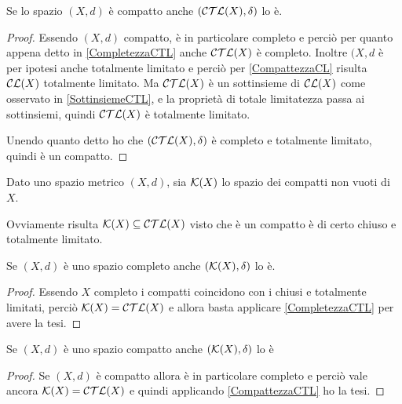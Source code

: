 \begin{corollary}\label{CompattezzaCTL}
	Se lo spazio $(X,d)$ è compatto anche $(\mathcal{CTL}(X),\delta)$ lo è.
\end{corollary}
\begin{proof}
	Essendo $(X,d)$ compatto, è in particolare completo e perciò per quanto appena detto in \cref{CompletezzaCTL} anche $\mathcal{CTL}(X)$ è completo. Inoltre $(X,d$ è per ipotesi anche totalmente limitato e perciò per \cref{CompattezzaCL} risulta $\mathcal{CL}(X)$ totalmente limitato. Ma $\mathcal{CTL}(X)$ è un sottinsieme di $\mathcal{CL}(X)$ come osservato in \cref{SottinsiemeCTL}, e la proprietà di totale limitatezza passa ai sottinsiemi, quindi $\mathcal{CTL}(X)$ è totalmente limitato.
	
	Unendo quanto detto ho che $(\mathcal{CTL}(X),\delta)$ è completo e totalmente limitato, quindi è un compatto.
\end{proof}

\begin{definition}
	Dato uno spazio metrico $(X,d)$, sia $\mathcal{K}(X)$ lo spazio dei compatti non vuoti di $X$.
\end{definition}
\begin{remark}
	Ovviamente risulta $\mathcal{K}(X)\subseteq \mathcal{CTL}(X)$ visto che è un compatto è di certo chiuso e totalmente limitato.
\end{remark}

\begin{corollary}
	Se $(X,d)$ è uno spazio completo anche $(\mathcal{K}(X),\delta)$ lo è.
\end{corollary}
\begin{proof}
	Essendo $X$ completo i compatti coincidono con i chiusi e totalmente limitati, perciò $\mathcal{K}(X)=\mathcal{CTL}(X)$ e allora basta applicare \cref{CompletezzaCTL} per avere la tesi.
\end{proof}


\begin{corollary}
	Se $(X,d)$ è uno spazio compatto anche $(\mathcal{K}(X),\delta)$ lo è
\end{corollary}
\begin{proof}
	Se $(X,d)$ è compatto allora è in particolare completo e perciò vale ancora $\mathcal{K}(X)=\mathcal{CTL}(X)$ e quindi applicando \cref{CompattezzaCTL} ho la tesi. 
\end{proof}







